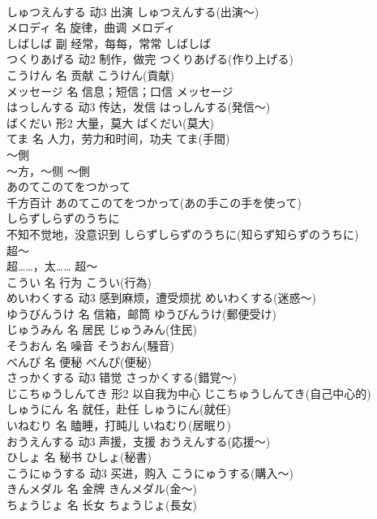 \documentclass[8pt]{extreport}
\begin{document}
\begin{CJK}{UTF8}{min}
\\	しゅつえんする	动3	出演	しゅつえんする(出演～)	
\\	メロディ	名	旋律，曲调	メロディ	
\\	しばしば	副	经常，每每，常常	しばしば	
\\	つくりあげる	动2	制作，做完	つくりあげる(作り上げる)	
\\	こうけん	名	贡献	こうけん(貢献)	
\\	メッセージ	名	信息；短信；口信	メッセージ	
\\	はっしんする	动3	传达，发信	はっしんする(発信～)	
\\	ばくだい	形2	大量，莫大	ばくだい(莫大)	
\\	てま	名	人力，劳力和时间，功夫	てま(手間)	
\\	～側	
\\	～方，～侧	～側	
\\	あのてこのてをつかって	
\\	千方百计	あのてこのてをつかって(あの手この手を使って)	
\\	しらずしらずのうちに	
\\	不知不觉地，没意识到	しらずしらずのうちに(知らず知らずのうちに)	
\\	超～	
\\	超……，太……	超～	
\\	こうい	名	行为	こうい(行為)	
\\	めいわくする	动3	感到麻烦，遭受烦扰	めいわくする(迷惑～)	
\\	ゆうびんうけ	名	信箱，邮筒	ゆうびんうけ(郵便受け)	
\\	じゅうみん	名	居民	じゅうみん(住民)	
\\	そうおん	名	噪音	そうおん(騒音)	
\\	べんぴ	名	便秘	べんぴ(便秘)	
\\	さっかくする	动3	错觉	さっかくする(錯覚～)	
\\	じこちゅうしんてき	形2	以自我为中心	じこちゅうしんてき(自己中心的)	
\\	しゅうにん	名	就任，赴任	しゅうにん(就任)	
\\	いねむり	名	瞌睡，打盹儿	いねむり(居眠り)	
\\	おうえんする	动3	声援，支援	おうえんする(応援～)	
\\	ひしょ	名	秘书	ひしょ(秘書)	
\\	こうにゅうする	动3	买进，购入	こうにゅうする(購入～)	
\\	きんメダル	名	金牌	きんメダル(金～)	
\\	ちょうじょ	名	长女	ちょうじょ(長女)	

\end{CJK}
\end{document}
